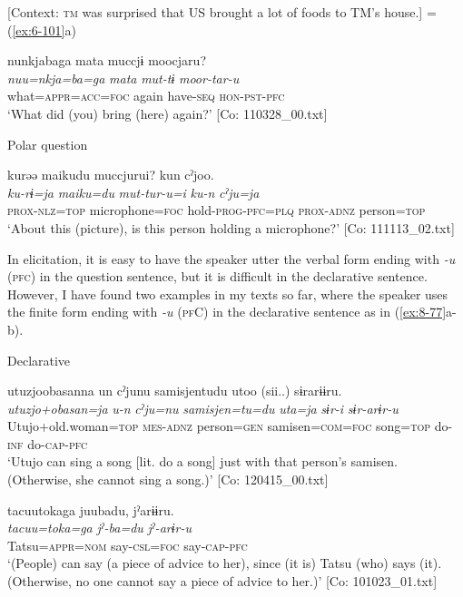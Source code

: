 \ex{} [Context: \textsc{tm} was surprised that US brought a lot of foods to TM’s house.] = (\ref{ex:6-101}a)

{\TM}
\glll  nunkjabaga  mata  muccjɨ  moocjaru?\\
\textit{nuu=nkja=ba=ga}  \textit{mata}  \textit{mut-tɨ}  \textit{moor-tar-u}\\
what=\textsc{appr}=\textsc{acc}=\textsc{foc}  again  have-\textsc{seq}  \textsc{hon}-\textsc{pst}-\textsc{pfc}\\
\glt ‘What did (you) bring (here) again?’ [Co: 110328\_00.txt]

  Polar question

\ex
{\TM}
\glll  kurəə  {\textbar}maiku{\textbar}du  muccjurui?      kun  cˀjoo.  \\
\textit{ku-rɨ=ja}  \textit{maiku=du}  \textit{mut-tur-u=i}  \textit{ku-n}  \textit{cˀju=ja}  \\
\textsc{prox}-\textsc{nlz}=\textsc{top}  microphone=\textsc{foc}  hold-\textsc{prog}-\textsc{pfc}=\textsc{plq}  \textsc{prox}-\textsc{adnz}  person=\textsc{top}\\
\glt ‘About this (picture), is this person holding a microphone?’ [Co: 111113\_02.txt]
\z
\z

In elicitation, it is easy to have the speaker utter the verbal form ending with \textit{-u} (\textsc{pfc}) in the question sentence, but it is difficult in the declarative sentence. However, I have found two examples in my texts so far, where the speaker uses the finite form ending with \textit{-u} (\textsc{pf}C) in the declarative sentence as in (\ref{ex:8-77}a-b).

\ea\label{ex:8-77}
  Declarative

\ea
{\TM}
\glll  utuzjoobasanna  un  cˀjunu  samisjentudu      utoo  (sii..)  sɨrarɨɨru.  \\
\textit{utuzjo+obasan=ja}  \textit{u-n}  \textit{cˀju=nu}  \textit{samisjen=tu=du}      \textit{uta=ja}  \textit{sɨr-i}  \textit{sɨr-arɨr-u}  \\
Utujo+old.woman=\textsc{top}  \textsc{mes}-\textsc{adnz}  person=\textsc{gen}  samisen=\textsc{com}=\textsc{foc}   song=\textsc{top}  do-\textsc{inf}  do-\textsc{cap}-\textsc{pfc}\\
\glt ‘Utujo can sing a song [lit. do a song] just with that person’s samisen. (Otherwise, she cannot sing a song.)’ [Co: 120415\_00.txt]

\ex
{\TM}
\glll  tacuu{\textbar}toka{\textbar}ga  juubadu,  jˀarɨɨru.\\
\textit{tacuu=toka=ga}  \textit{jˀ-ba=du}  \textit{jˀ-arɨr-u}\\
Tatsu=\textsc{appr}=\textsc{nom}  say-\textsc{csl}=\textsc{foc}  say-\textsc{cap}-\textsc{pfc}\\
\glt ‘(People) can say (a piece of advice to her), since (it is) Tatsu (who) says (it). (Otherwise, no one cannot say a piece of advice to her.)’ [Co: 101023\_01.txt]
\z
\z

